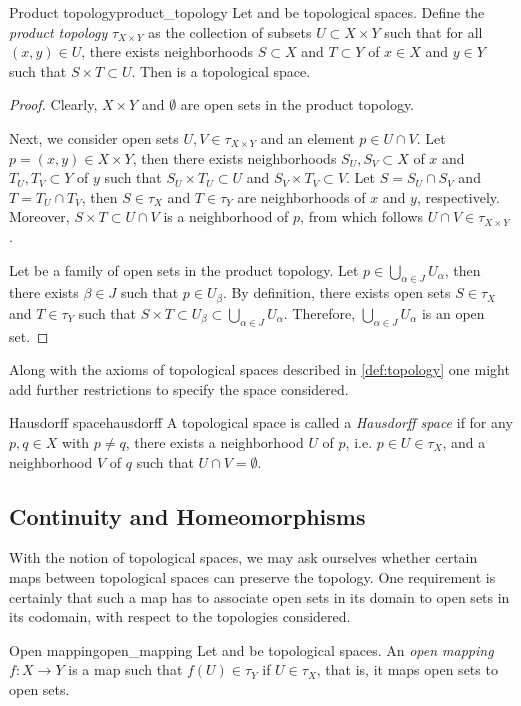 \begin{proposition}{Product topology}{product_topology}
    Let  and  be topological spaces. Define the \emph{product topology} \(\tau_{X\times Y}\) as the collection of subsets \(U \subset X \times Y\) such that for all \((x,y) \in U\), there exists neighborhoods \(S \subset X\) and \(T \subset Y\) of \(x \in X\) and \(y\in Y\) such that \(S \times T \subset U\). Then  is a topological space.
\end{proposition}
\begin{proof}
    Clearly, \(X\times Y\) and \(\emptyset\) are open sets in the product topology.

    Next, we consider open sets \(U, V \in \tau_{X\times Y}\) and an element \(p \in U \cap V\). Let \(p = (x, y) \in X \times Y\), then there exists neighborhoods \(S_U, S_V\subset X\) of \(x\) and \(T_U, T_V \subset Y\) of \(y\) such that \(S_U \times T_U \subset U\) and \(S_V \times T_V \subset V\). Let \(S = S_U \cap S_V\) and \(T = T_U \cap T_V\), then \(S \in \tau_X\) and \(T \in \tau_Y\) are neighborhoods of \(x\) and \(y\), respectively. Moreover, \(S \times T \subset U \cap V\) is a neighborhood of \(p\), from which follows \(U \cap V \in \tau_{X\times Y}\).

    Let  be a family of open sets in the product topology. Let \(p\in \bigcup_{\alpha\in J}U_\alpha\), then there exists \(\beta \in J\) such that \(p \in U_{\beta}\). By definition, there exists open sets \(S \in \tau_X\) and \(T \in \tau_Y\) such that \(S \times T \subset U_\beta \subset \bigcup_{\alpha\in J} U_\alpha\). Therefore, \(\bigcup_{\alpha\in J}U_\alpha\) is an open set.
\end{proof}

Along with the axioms of topological spaces described in \cref{def:topology} one might add further restrictions to specify the space considered.
\begin{definition}{Hausdorff space}{hausdorff}
    A topological space  is called a \emph{Hausdorff space} if for any \(p,q\in X\) with \(p\neq q\), there exists a neighborhood \(U\) of \(p\), i.e. \(p \in U \in \tau_X\), and a neighborhood \(V\) of \(q\) such that \(U \cap V = \emptyset\).
\end{definition}

\subsection{Continuity and Homeomorphisms}
With the notion of topological spaces, we may ask ourselves whether certain maps between topological spaces can preserve the topology. One requirement is certainly that such a map has to associate open sets in its domain to open sets in its codomain, with respect to the topologies considered.
\begin{definition}{Open mapping}{open_mapping}
    Let  and  be topological spaces. An \emph{open mapping} \(f : X \to Y\) is a map such that \(f(U) \in \tau_Y\) if \(U \in \tau_X\), that is, it maps open sets to open sets.
\end{definition}

